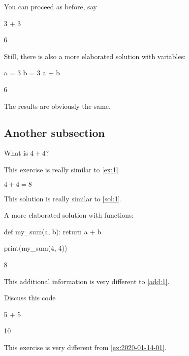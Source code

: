 \documentclass[oneside]{book}
\begin{document}
\begin{additionalinformation}
You can proceed as before, say
\begin{pycell}
3 + 3
\end{pycell}
\begin{pyexpectedoutput}
6
\end{pyexpectedoutput}

Still, there is also a more elaborated solution with variables:

\begin{pycell}
a = 3
b = 3
a + b
\end{pycell}
\begin{pyexpectedoutput}
6
\end{pyexpectedoutput}

The results are obviously the same.
\end{additionalinformation}

\subsection{Another subsection}

\begin{exercise}
  What is \(4 + 4\)?

  This exercise is really similar to \cref{ex:1}.
\end{exercise}

\begin{solution}
  \(4 + 4 = 8\)

  This solution is really similar to \cref{sol:1}.
\end{solution}

\begin{additionalinformation}
A more elaborated solution with functions:

\begin{pycell}
def my_sum(a, b):
    return a + b

print(my_sum(4, 4))
\end{pycell}
\begin{pyexpectedoutput}
8
\end{pyexpectedoutput}

This additional information is very different to \cref{add:1}.
\end{additionalinformation}

\begin{exercise}[examdate={January 15, 2020}, examproblemnumber={1}, examproblemid={2020-01-15-01}]
Discuss this code

\begin{pycell}
5 + 5
\end{pycell}
\begin{pyexpectedoutput}
10
\end{pyexpectedoutput}

This exercise is very different from \cref{ex:2020-01-14-01}.
\end{exercise}
\end{document}

